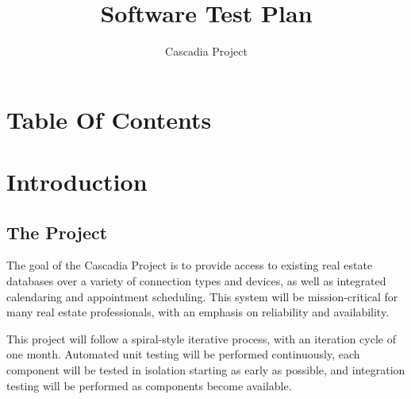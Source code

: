 \documentclass[11pt]{wacomepd}
\begin{document}
\date{Cascadia Project}
\title{Software Test Plan} 
\maketitle


\chapter{Table Of Contents}
\tableofcontents
\listoftodos
\clearpage


\chapter{Introduction}


\section{The Project}
The goal of the Cascadia Project is to provide access to existing real estate databases over a
variety of connection types and devices, as well as integrated calendaring and appointment
scheduling.  This system will be mission-critical for many real estate professionals, with an
emphasis on reliability and availability.

This project will follow a spiral-style iterative process, with an iteration cycle of one month.
Automated unit testing will be performed continuously, each component will be tested in isolation
starting as early as possible, and integration testing will be performed as components become
available.
\end{document}
